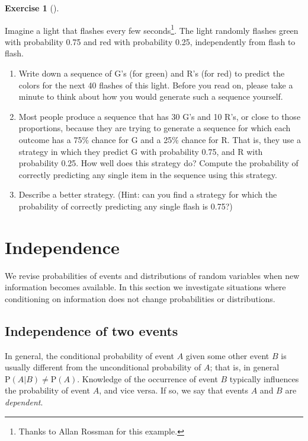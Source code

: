 \documentclass[
  letterpaper,
  DIV=11,
  numbers=noendperiod]{scrreprt}
\providecommand{\tightlist}{%
  \setlength{\itemsep}{0pt}\setlength{\parskip}{0pt}}
\theoremstyle{plain}
\theoremstyle{definition}
\theoremstyle{definition}
\newtheorem{exercise}{Exercise}[chapter]
\theoremstyle{definition}
\theoremstyle{remark}
\begin{document}
\begin{exercise}[]\protect\hypertarget{exr-ltp-rats}{}\label{exr-ltp-rats}

Imagine a light that flashes every few seconds\footnote{Thanks to Allan
  Rossman for this example.}. The light randomly flashes green with
probability 0.75 and red with probability 0.25, independently from flash
to flash.

\begin{enumerate}
\def\labelenumi{\arabic{enumi}.}
\tightlist
\item
  Write down a sequence of G's (for green) and R's (for red) to predict
  the colors for the next 40 flashes of this light. Before you read on,
  please take a minute to think about how you would generate such a
  sequence yourself.
\item
  Most people produce a sequence that has 30 G's and 10 R's, or close to
  those proportions, because they are trying to generate a sequence for
  which each outcome has a 75\% chance for G and a 25\% chance for R.
  That is, they use a strategy in which they predict G with probability
  0.75, and R with probability 0.25. How well does this strategy do?
  Compute the probability of correctly predicting any single item in the
  sequence using this strategy.
\item
  Describe a better strategy. (Hint: can you find a strategy for which
  the probability of correctly predicting any single flash is 0.75?)
\end{enumerate}

\end{exercise}

\section{Independence}\label{sec-independence}

We revise probabilities of events and distributions of random variables
when new information becomes available. In this section we investigate
situations where conditioning on information does not change
probabilities or distributions.

\subsection{Independence of two
events}\label{independence-of-two-events}

In general, the conditional probability of event \(A\) given some other
event \(B\) is usually different from the unconditional probability of
\(A\); that is, in general \(\textrm{P}(A | B) \neq \textrm{P}(A)\).
Knowledge of the occurrence of event \(B\) typically influences the
probability of event \(A\), and vice versa. If so, we say that events
\(A\) and \(B\) are \emph{dependent}.
\end{document}
